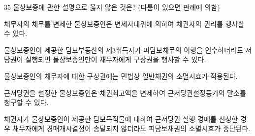 \begin{question}{35}
물상보증에 관한 설명으로 옳지 않은 것은? (다툼이 있으면 판례에 의함)
\begin{choices}
  \item 채무자의 채무를 변제한 물상보증인은 변제자대위에 의하여 채권자의 권리를 행사할 수 있다.
  \item 물상보증인이 제공한 담보부동산의 제3취득자가 피담보채무의 이행을 인수하더라도 저당권이 실행되면 물상보증인만이 채무자에게 구상권을 행사할 수 있다.
  \item 물상보증인의 채무자에 대한 구상권에는 민법상 일반채권의 소멸시효가 적용된다.
  \item 근저당권을 설정한 물상보증인은 채권최고액을 변제하여 근저당권설정등기의 말소를 청구할 수 있다.
  \item 채권자가 물상보증인이 제공한 담보목적물에 대하여 근저당권 실행 경매를 신청한 경우 채무자에게 경매개시결정이 송달되지 않더라도 피담보채권의 소멸시효가 중단된다.
\end{choices}
\end{question}
